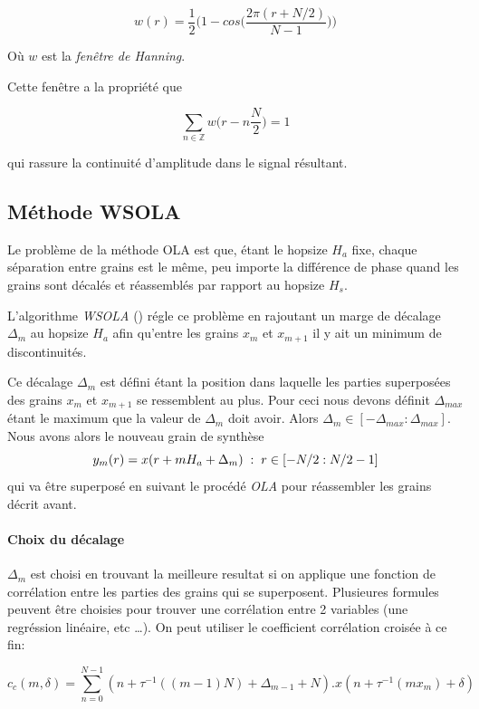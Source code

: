 \documentclass[letterpaper]{article}
\begin{document}
$$ w(r) = \frac{1}{2} \bigg(1 - cos \bigg(\frac{2\pi(r + N/2)}{N-1}\bigg) \bigg) $$

Où $w$ est la \emph{fenêtre de Hanning}.

Cette fenêtre a la propriété que

$$ \sum_{n \in \mathbb{Z}} w \bigg( r - n \frac{N}{2} \bigg) = 1 $$

qui rassure la continuité d'amplitude dans le signal résultant. 

\subsection{Méthode WSOLA}

Le problème de la méthode OLA est que, étant le hopsize $H_a$ fixe, chaque séparation entre grains
est le même, peu importe la différence de phase quand les grains sont décalés et réassemblés par
rapport au hopsize $H_s$.

L'algorithme \emph{WSOLA} (\cite{WSOLA}) régle ce problème en rajoutant un marge de décalage
$\Delta_m$ au hopsize $H_a$ afin qu'entre les grains $x_m$ et $x_{m+1}$ il y ait un minimum de
discontinuités.

Ce décalage $\Delta_m$ est défini étant la position dans laquelle les parties superposées des grains
$x_m$ et $x_{m+1}$ se ressemblent au plus. Pour ceci nous devons définit $\Delta_{max}$ étant le
maximum que la valeur de $\Delta_m$ doit avoir. Alors $\Delta_m \in [-\Delta_{max} : \Delta_{max}]$.
Nous avons alors le nouveau grain de synthèse
$$ y_m(r) = x(r + mH_a + \Delta_m) \hspace{0.1cm} : \hspace{0.1cm} r \in [-N/2 : N/2 -1] $$
qui va être superposé en suivant le procédé \emph{OLA} pour réassembler les grains décrit avant.

\paragraph{Choix du décalage} $\Delta_m$ est choisi en trouvant la meilleure resultat si on applique
une fonction de corrélation entre les parties des grains qui se superposent. Plusieures formules
peuvent être choisies pour trouver une corrélation entre 2 variables (une regréssion linéaire, etc
\dots). On peut utiliser le coefficient corrélation croisée à ce fin:

$$ c_c (m,\delta) = \sum^{N-1}_{n=0} (n + \tau^{-1} ((m-1)N) + \Delta_{m-1}+N).x(n + \tau^{-1}(mx_m)+\delta)$$
\end{document}
